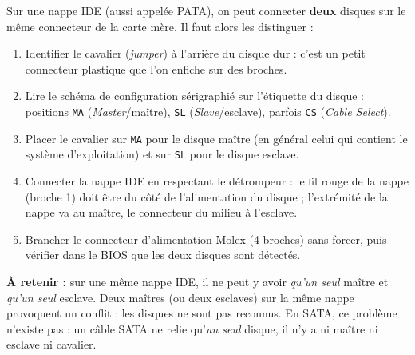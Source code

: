 \documentclass[11pt]{article}
\newcommand{\cle}[1]{{\popxbold\color{popdark}#1}}
\begin{document}
\begin{methode}
Sur une nappe \cle{IDE} (aussi appelée PATA), on peut connecter \textbf{deux} disques sur le même connecteur de la carte mère. Il faut alors les distinguer :
\begin{enumerate}
\item \cle{Identifier} le cavalier (\emph{jumper}) à l'arrière du disque dur : c'est un petit connecteur plastique que l'on enfiche sur des broches.
\item \cle{Lire} le schéma de configuration sérigraphié sur l'étiquette du disque : positions \texttt{MA} (\emph{Master}/maître), \texttt{SL} (\emph{Slave}/esclave), parfois \texttt{CS} (\emph{Cable Select}).
\item \cle{Placer} le cavalier sur \texttt{MA} pour le disque maître (en général celui qui contient le système d'exploitation) et sur \texttt{SL} pour le disque esclave.
\item \cle{Connecter} la nappe IDE en respectant le détrompeur : le fil rouge de la nappe (broche 1) doit être du côté de l'alimentation du disque ; l'extrémité de la nappe va au maître, le connecteur du milieu à l'esclave.
\item \cle{Brancher} le connecteur d'alimentation Molex (4 broches) sans forcer, puis vérifier dans le BIOS que les deux disques sont détectés.
\end{enumerate}
\textbf{À retenir :} sur une même nappe IDE, il ne peut y avoir \emph{qu'un seul} maître et \emph{qu'un seul} esclave. Deux maîtres (ou deux esclaves) sur la même nappe provoquent un conflit : les disques ne sont pas reconnus. En \cle{SATA}, ce problème n'existe pas : un câble SATA ne relie qu'\emph{un seul} disque, il n'y a ni maître ni esclave ni cavalier.
\end{methode}
\end{document}
